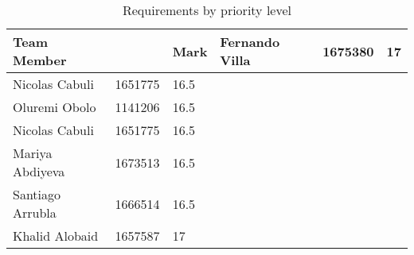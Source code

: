 

\begin{table}[ht]
\caption{Requirements by priority level}
\label{tab:requirements}
    \begin{tabular}[c]{ | p{5cm} | p{5cm} | p{5cm} |}
		\hline
		\centering\textbf{Team Member} &  & \centering\textbf{Mark} &
    \hline
    Fernando Villa & 1675380 & 17 \\
    \hline
    Nicolas Cabuli & 1651775 & 16.5 \\
    \hline
	Oluremi Obolo & 1141206 & 16.5\\
    \hline
    Nicolas Cabuli & 1651775 & 16.5 \\
    \hline
	Mariya Abdiyeva & 1673513 & 16.5 \\
    \hline
	Santiago Arrubla & 1666514 & 16.5 \\	
    \hline
	Khalid Alobaid & 1657587  & 17 \\
    \hline
    \end{tabular}
\end{table}
